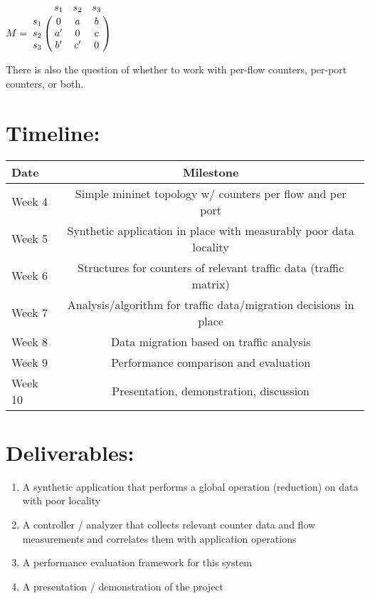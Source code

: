 \documentclass[12pt]{article}
\begin{document}
$
M = \bordermatrix{~ & s_1 & s_2 & s_3 \cr
                  s_1 & 0  & a & b \cr
                  s_2 & a' & 0 & c \cr
                  s_3 & b' & c' & 0 \cr}
$
\\
\vspace{3mm}

There is also the question of whether to work with per-flow counters, per-port counters, or both.

\section*{Timeline:}
\label{timeline}
\begin{center}
  \begin{tabular}{ l || c }
    \hline
    Date & Milestone \\ \hline \hline
    Week 4  & Simple mininet topology w/ counters per flow and per port \\ \hline
    Week 5  & Synthetic application in place with measurably poor data locality \\ \hline
    Week 6  & Structures for counters of relevant traffic data (traffic matrix) \\ \hline
    Week 7  & Analysis/algorithm for traffic data/migration decisions in place \\ \hline
    Week 8  & Data migration based on traffic analysis \\ \hline
    Week 9  & Performance comparison and evaluation \\ \hline
    Week 10 & Presentation, demonstration, discussion \\ 
    \hline
  \end{tabular}
\end{center}


\section*{Deliverables:}
\label{deriverables}
\begin{enumerate}
\item A synthetic application that performs a global operation (reduction) on data with poor locality
\item A controller / analyzer that collects relevant counter data and flow measurements and correlates them with application operations
\item A performance evaluation framework for this system
\item A presentation / demonstration of the project
\end{enumerate}



%
%
\end{document}
